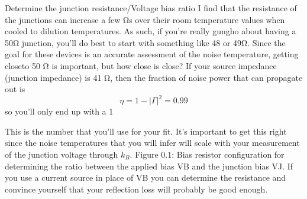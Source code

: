 \documentclass[11pt]{article}
\begin{document}
Determine the junction resistance/Voltage bias ratio I ﬁnd that the resistance of the junctions can increase a few Ωs over their room temperature values when cooled to dilution temperatures. As such, if you’re really gungho about having a 50Ω junction, you’ll do best to start with something like 48 or 49Ω. Since the goal for these
devices is an accurate assessment of the noise temperature, getting closeto 50 Ω is important, but how close is close? If your source impedance (junction impedance) is 41 Ω, then the fraction of noise power that can propagate out is 
$$
\eta= 1−|\Gamma|^2 = 0.99 
$$
so you’ll only end up with a 1%




This is the number that you’ll use for your ﬁt. It’s important to get this right since the noise temperatures that you will infer will scale with your measurement of the junction voltage through $k_B$.
Figure 0.1: Bias resistor conﬁguration for determining the ratio between the applied bias VB and the junction bias VJ. If you use a current source in place of VB you can determine the resistance and convince yourself that your reﬂection loss will probably be good enough.
\end{document}
